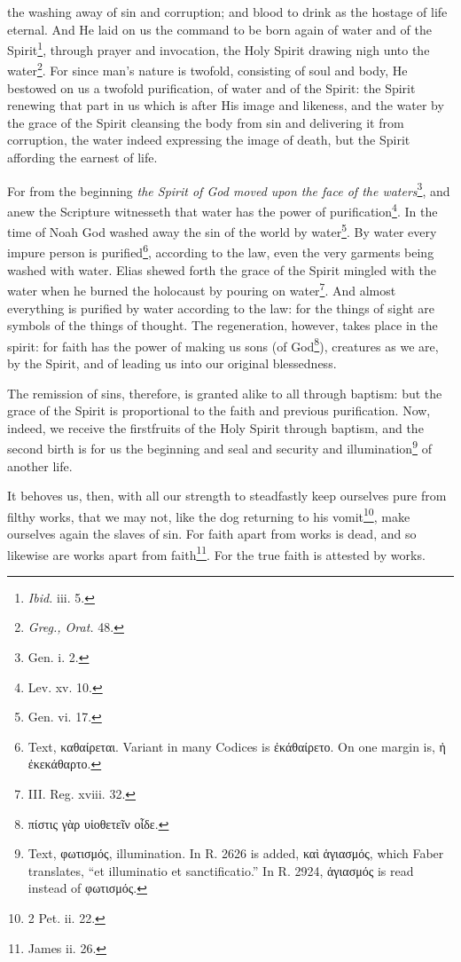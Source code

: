 the washing away of sin and corruption; and blood to drink as the hostage of life eternal. And He laid on us the command to be born again of water and of the Spirit\footnote{\emph{Ibid. }iii. 5.}, through prayer and invocation, the Holy Spirit drawing nigh unto the water\footnote{\emph{Greg., Orat.} 48.}. For since man’s nature is twofold, consisting of soul and body, He bestowed on us a twofold purification, of water and of the Spirit: the Spirit renewing that part in us which is after His image and likeness, and the water by the grace of the Spirit cleansing the body from sin and delivering it from corruption, the water indeed expressing the image of death, but the Spirit affording the earnest of life.

For from the beginning \emph{the Spirit of God moved upon the face of the waters}\footnote{Gen. i. 2.}, and anew the Scripture witnesseth that water has the power of purification\footnote{Lev. xv. 10.}. In the time of Noah God washed away the sin of the world by water\footnote{Gen. vi. 17.}. By water every impure person is purified\footnote{Text, \textgreek{καθαίρεται}. Variant in many Codices is \textgreek{ἐκάθαίρετο}. On one margin is, \textgreek{ἠ ἐκεκάθαρτο}.}, according to the law, even the very garments being washed with water. Elias shewed forth the grace of the Spirit mingled with the water when he burned the holocaust by pouring on water\footnote{III. Reg. xviii. 32.}. And almost everything is purified by water according to the law: for the things of sight are symbols of the things of thought. The regeneration, however, takes place in the spirit: for faith has the power of making us sons (of God\footnote{\textgreek{πίστις γὰρ υἱοθετεῖν οἶδε}.}), creatures as we are, by the Spirit, and of leading us into our original blessedness.

The remission of sins, therefore, is granted alike to all through baptism: but the grace of the Spirit is proportional to the faith and previous purification. Now, indeed, we receive the firstfruits of the Holy Spirit through baptism, and the second birth is for us the beginning and seal and security and illumination\footnote{Text, \textgreek{φωτισμός}, illumination. In R. 2626 is added, \textgreek{καὶ ἁγιασμός}, which Faber translates, “et illuminatio et sanctificatio.” In R. 2924, \textgreek{ἁγιασμός} is read instead of \textgreek{φωτισμός}.} of another life.

It behoves us, then, with all our strength to steadfastly keep ourselves pure from filthy works, that we may not, like the dog returning to his vomit\footnote{2 Pet. ii. 22.}, make ourselves again the slaves of sin. For faith apart from works is dead, and so likewise are works apart from faith\footnote{James ii. 26.}. For the true faith is attested by works.

